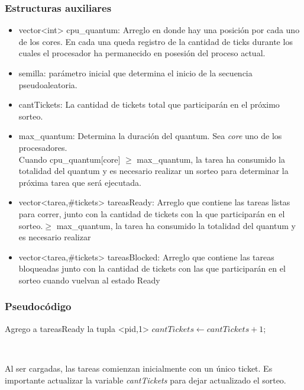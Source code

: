 \subsubsection{Estructuras auxiliares}

\begin{itemize}
  \item vector<int> cpu\_quantum: Arreglo en donde hay una posición por cada uno de los cores. En cada una queda registro de la cantidad de ticks durante los cuales el procesador ha permanecido
  en posesión del proceso actual. 
  \item semilla: parámetro inicial que determina el inicio de la secuencia pseudoaleatoria.
  \item cantTickets: La cantidad de tickets total que participarán en el próximo sorteo.
  \item max\_quantum: Determina la duración del quantum. Sea \emph{core} uno de los procesadores.\\ 
  Cuando cpu\_quantum[core] $\geq$ max\_quantum, la tarea ha consumido la totalidad del quantum y es necesario realizar
  un sorteo para determinar la próxima tarea que será ejecutada.
  \item vector<tarea,\#tickets> tareasReady: Arreglo que contiene las tareas listas para correr, junto con la cantidad de tickets con la que participarán en el sorteo.$\geq$ max\_quantum, la tarea ha consumido la totalidad del quantum y es necesario realizar
  \item vector<tarea,\#tickets> tareasBlocked: Arreglo que contiene las tareas bloqueadas junto con la cantidad de tickets con las que participarán en el sorteo cuando vuelvan al estado Ready
\end{itemize}

\subsubsection{Pseudocódigo}

\begin{algorithmic}
      \State Agrego a tareasReady la tupla <pid,1>
      \State $cantTickets \gets cantTickets+1$;
  \EndFunction
\end{algorithmic}

~

Al ser cargadas, las tareas comienzan inicialmente con un único ticket. Es importante actualizar la variable \emph{cantTickets} para dejar actualizado el sorteo.

~

